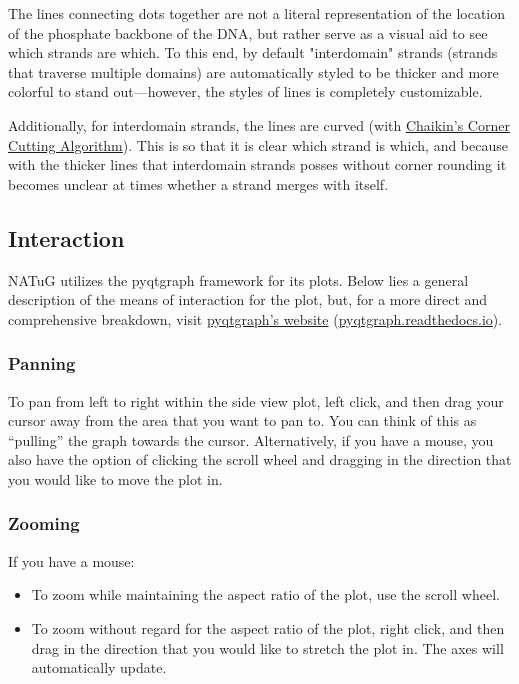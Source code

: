 \documentclass[titlepage]{article}
\begin{document}
	The lines connecting dots together are not a literal representation of the location of the phosphate backbone of the DNA, but rather serve as a visual aid to see which strands are which. To this end, by default "interdomain" strands (strands that traverse multiple domains) are automatically styled to be thicker and more colorful to stand out—however, the styles of lines is completely customizable.
	
	Additionally, for interdomain strands, the lines are curved (with \href{https://www.cs.unc.edu/~dm/UNC/COMP258/LECTURES/Chaikins-Algorithm.pdf}{Chaikin's Corner Cutting Algorithm}). This is so that it is clear which strand is which, and because with the thicker lines that interdomain strands posses without corner rounding it becomes unclear at times whether a strand merges with itself. 
	
	\subsection{Interaction}
	NATuG utilizes the pyqtgraph framework for its plots. Below lies a general description of the means of interaction for the plot, but, for a more direct and comprehensive breakdown, visit \href{https://pyqtgraph.readthedocs.io/en/latest/user_guide/mouse_interaction.html}{pyqtgraph’s website} (\href{https://pyqtgraph.readthedocs.io/en/latest/user_guide/mouse_interaction.html}{pyqtgraph.readthedocs.io}).
	
	\subsubsection{Panning}
	To pan from left to right within the side view plot, left click, and then drag your cursor away from the area that you want to pan to. You can think of this as “pulling” the graph towards the cursor. Alternatively, if you have a mouse, you also have the option of clicking the scroll wheel and dragging in the direction that you would like to move the plot in.
	
	\subsubsection{Zooming}
	If you have a mouse:
	\begin{itemize}
		\item To zoom while maintaining the aspect ratio of the plot, use the scroll wheel.
		\item To zoom without regard for the aspect ratio of the plot, right click, and then drag in the direction that you would like to stretch the plot in. The axes will automatically update.
	\end{itemize}
	
\end{document}
